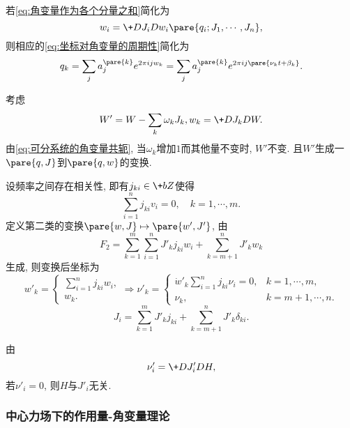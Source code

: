 \documentclass[../TheoreticalMechanics.tex]{subfiles}
\begin{document}
\begin{lemma}[角变量可分的情形]
    若\eqref{eq:角变量作为各个分量之和}简化为
    \[ w_i = \+D{J_i}D{w_i}\pare{q_i;J_1,\cdots,J_n}, \]
    则相应的\eqref{eq:坐标对角变量的周期性}简化为
    \[ q_k = \sum_j a_j^{\pare{k}}e^{2\pi ij w_k} = \sum_j a_j^{\pare{k}}e^{2\pi ij \pare{\nu_k t + \beta_k}}. \]
\end{lemma}
\begin{lemma}
    考虑
    \[ W' = W - \sum_k \omega_k J_k, w_k = \+D{J_k}D{W}. \]
    由\eqref{eq:可分系统的角变量共轭}, 当$\omega_k$增加$1$而其他量不变时, $W'$不变. 且$W'$生成一$\pare{q,J}$到$\pare{q,w}$的变换.
\end{lemma}
\begin{lemma}[退化频率约化角变量]
    \label{lem:退化频率约化角变量}
    设频率之间存在相关性, 即有$j_{ki}\in \+bZ$使得
    \[ \sum_{i=1}^n j_{ki}v_i = 0,\quad k = 1, \cdots, m. \]
    定义第二类的变换$\pare{w,J}\mapsto\pare{w',J'}$, 由
    \[ F_2 = \sum_{k=1}^m \sum_{i=1}^n J'_k j_{ki}w_i + \sum_{k=m+1}^n J'_k w_k \]
    生成, 则变换后坐标为
    \[ w'_k = \left\{\begin{array}{l}
        \sum_{i=1}^n j_{ki}w_i,\\
        w_k.
    \end{array}\right.\Rightarrow \nu'_k = \left\{\begin{array}{ll}
        \dot{w}'_k\sum_{i=1}^n j_{ki}\nu_i = 0, & k = 1,\cdots, m,\\
        \nu_k, & k = m+1,\cdots, n.
    \end{array}\right. \]
    \[ J_i = \sum_{k=1}^m J'_k j_{ki} + \sum_{k=m+1}^n J'_k\delta_{ki}. \]
\end{lemma}
\begin{lemma}[$H$无关于退化角变量]
    由
    \[ \nu'_i = \+D{J'_i}D{H}, \]
    若$\nu'_i=0$, 则$H$与$J'_i$无关.
\end{lemma}


\subsubsection{中心力场下的作用量-角变量理论} %
\label{ssub:中心力场下的作用量_角变量理论}
\end{document}

